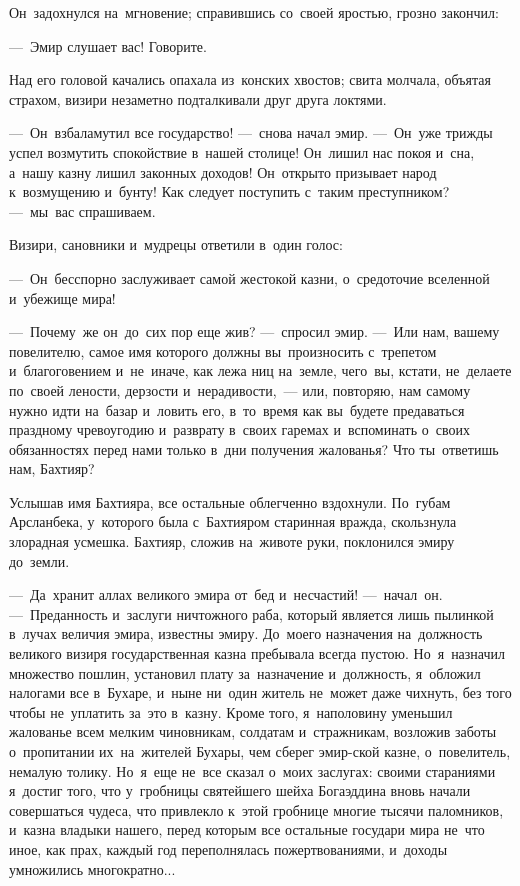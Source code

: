 \documentclass[12pt,a4paper]{book}
\begin{document}
Он~задохнулся на~мгновение; справившись со~своей яростью, грозно закончил:

—~Эмир слушает вас! Говорите.

Над его головой качались опахала из~конских хвостов; свита молчала, объятая страхом, визири незаметно подталкивали друг друга локтями.

—~Он~взбаламутил все государство! —~снова начал эмир. —~Он~уже трижды успел возмутить спокойствие в~нашей столице! Он~лишил нас покоя и~сна, а~нашу казну лишил законных доходов! Он~открыто призывает народ к~возмущению и~бунту! Как следует поступить с~таким преступником? —~мы~вас спрашиваем.

Визири, сановники и~мудрецы ответили в~один голос:

—~Он~бесспорно заслуживает самой жестокой казни, о~средоточие вселенной и~убежище мира!

—~Почему~же он~до~сих пор еще жив? —~спросил эмир. —~Или нам, вашему повелителю, самое имя которого должны вы~произносить с~трепетом и~благоговением и~не~иначе, как лежа ниц на~земле, чего~вы, кстати, не~делаете по~своей лености, дерзости и~нерадивости,~— или, повторяю, нам самому нужно идти на~базар и~ловить его, в~то~время как вы~будете предаваться праздному чревоугодию и~разврату в~своих гаремах и~вспоминать о~своих обязанностях перед нами только в~дни получения жалованья? Что ты~ответишь нам, Бахтияр?

Услышав имя Бахтияра, все остальные облегченно вздохнули. По~губам Арсланбека, у~которого была с~Бахтияром старинная вражда, скользнула злорадная усмешка. Бахтияр, сложив на~животе руки, поклонился эмиру до~земли.

—~Да~хранит аллах великого эмира от~бед и~несчастий! —~начал~он. —~Преданность и~заслуги ничтожного раба, который является лишь пылинкой в~лучах величия эмира, известны эмиру. До~моего назначения на~должность великого визиря государственная казна пребывала всегда пустою. Но~я~назначил множество пошлин, установил плату за~назначение и~должность, я~обложил налогами все в~Бухаре, и~ныне ни~один житель не~может даже чихнуть, без того чтобы не~уплатить за~это в~казну. Кроме того, я~наполовину уменьшил жалованье всем мелким чиновникам, солдатам и~стражникам, возложив заботы о~пропитании их~на~жителей Бухары, чем сберег эмир-ской казне, о~повелитель, немалую толику. Но~я~еще не~все сказал о~моих заслугах: своими стараниями я~достиг того, что у~гробницы святейшего шейха Богаэддина вновь начали совершаться чудеса, что привлекло к~этой гробнице многие тысячи паломников, и~казна владыки нашего, перед которым все остальные государи мира не~что иное, как прах, каждый год переполнялась пожертвованиями, и~доходы умножились многократно...
\end{document}
